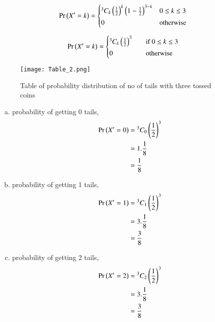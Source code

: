 \documentclass[journal,12pt,twocolumn]{IEEEtran}
\begin{document}
\begin{enumerate}[(i)]
\begin{align*}
   \pr{X'=k} =
  \begin{cases*}
    {^3 C_k}\left(\frac{1}{2}\right)^{k}\left(1-\frac{1}{2}\right)^{3-k} & $0 \leq k \leq 3$\\
    0 & otherwise
  \end{cases*}
\end{align*}

\begin{align}
   \pr{X'=k} =
  \begin{cases*}
    {^3 C_k}\left(\frac{1}{2}\right)^{3} \quad& if $0 \leq k \leq 3$ \\
    0 \quad& otherwise
  \end{cases*}
\end{align}

\begin{figure}[h!]
    \centering
    \texttt{[image: Table\_2.png]}
    \caption{Table of probability distribution of no of tails with three tossed coins}
    \label{fig:Table_2}
\end{figure}

\begin{enumerate}[(a)]
\item probability of getting 0 tails,
    \begin{align}
        \begin{split}
            \Pr\left(X'=0\right) &= {^3C_0}\left(\frac{1}{2}\right)^3\\
            &=1.\frac{1}{8}\\
            &=\frac{1}{8}
        \end{split}
    \end{align}

\item probability of getting 1 tails,
    \begin{align}
        \begin{split}
            \Pr\left(X'=1\right) &= {^3C_1}\left(\frac{1}{2}\right)^3\\
            &=3.\frac{1}{8}\\
            &=\frac{3}{8}
        \end{split}
    \end{align}

\item probability of getting 2 tails,
    \begin{align}
        \begin{split}
            \Pr\left(X'=2\right) &= {^3C_2}\left(\frac{1}{2}\right)^3\\
            &=3.\frac{1}{8}\\
            &=\frac{3}{8}
        \end{split}
    \end{align}


\end{enumerate}
\end{enumerate}
\end{document}
